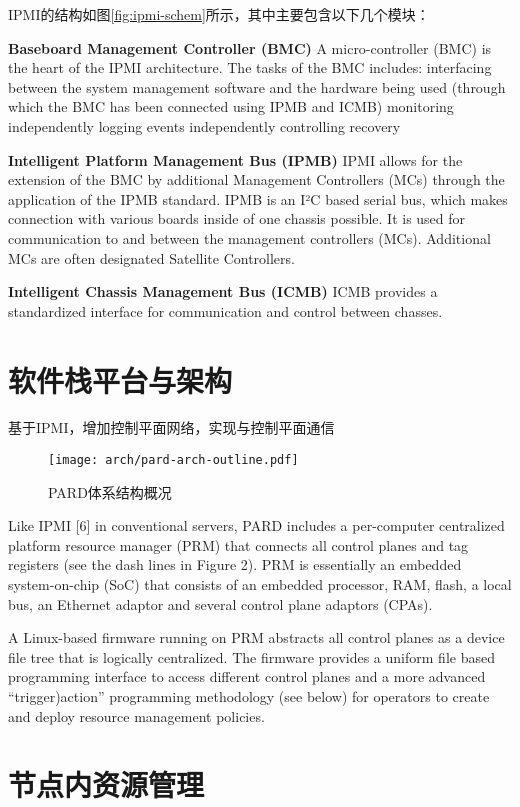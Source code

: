 IPMI的结构如图\ref{fig:ipmi-schem}所示，其中主要包含以下几个模块：

\textbf{Baseboard Management Controller (BMC)}\quad
A micro-controller (BMC) is the heart of the IPMI architecture. The tasks of the BMC includes:
interfacing between the system management software and the hardware being used (through which the BMC has been connected using IPMB and ICMB)
monitoring independently
logging events independently
controlling recovery

\textbf{Intelligent Platform Management Bus (IPMB)}\quad
IPMI allows for the extension of the BMC by additional Management Controllers (MCs) through the application of the IPMB standard.
IPMB is an I²C based serial bus, which makes connection with various boards inside of one chassis possible. It is used for communication to and between the management controllers (MCs). Additional MCs are often designated Satellite Controllers.

\textbf{Intelligent Chassis Management Bus (ICMB)}\quad
ICMB provides a standardized interface for communication and control between chasses.


\section{软件栈平台与架构}

基于IPMI，增加控制平面网络，实现与控制平面通信

\begin{figure}[tbh]
  \centering
  \texttt{[image: arch/pard-arch-outline.pdf]}
  \caption[PARD体系结构概况]{PARD体系结构概况}
  \label{fig:pard-arch-outline}
\end{figure}


Like IPMI [6] in conventional servers, PARD includes a
per-computer centralized platform resource manager (PRM) that
connects all control planes and tag registers (see the dash lines in
Figure 2). PRM is essentially an embedded system-on-chip (SoC)
that consists of an embedded processor, RAM, flash, a local bus, an
Ethernet adaptor and several control plane adaptors (CPAs).

A Linux-based firmware running on PRM abstracts all control
planes as a device file tree that is logically centralized. The
firmware provides a uniform file based programming interface to
access different control planes and a more advanced “trigger)action”
programming methodology (see below) for operators to create and
deploy resource management policies.


\section{节点内资源管理}

